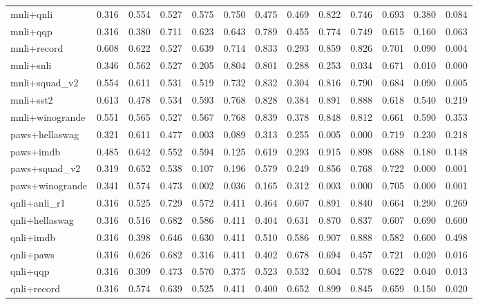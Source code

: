 \begin{table}[t]
\begin{tabular}{lrrrrrrrrrrrr}
    mnli+qnli & 0.316 & 0.554 & 0.527 & 0.575 & 0.750 & 0.475 & 0.469 & 0.822 & 0.746 & 0.693 & 0.380 & 0.084 \\
    mnli+qqp & 0.316 & 0.380 & 0.711 & 0.623 & 0.643 & 0.789 & 0.455 & 0.774 & 0.749 & 0.615 & 0.160 & 0.063 \\
    mnli+record & 0.608 & 0.622 & 0.527 & 0.639 & 0.714 & 0.833 & 0.293 & 0.859 & 0.826 & 0.701 & 0.090 & 0.004 \\
    mnli+snli & 0.346 & 0.562 & 0.527 & 0.205 & 0.804 & 0.801 & 0.288 & 0.253 & 0.034 & 0.671 & 0.010 & 0.000 \\
    mnli+squad\_v2 & 0.554 & 0.611 & 0.531 & 0.519 & 0.732 & 0.832 & 0.304 & 0.816 & 0.790 & 0.684 & 0.090 & 0.005 \\
    mnli+sst2 & 0.613 & 0.478 & 0.534 & 0.593 & 0.768 & 0.828 & 0.384 & 0.891 & 0.888 & 0.618 & 0.540 & 0.219 \\
    mnli+winogrande & 0.551 & 0.565 & 0.527 & 0.567 & 0.768 & 0.839 & 0.378 & 0.848 & 0.812 & 0.661 & 0.590 & 0.353 \\
    paws+hellaswag & 0.321 & 0.611 & 0.477 & 0.003 & 0.089 & 0.313 & 0.255 & 0.005 & 0.000 & 0.719 & 0.230 & 0.218 \\
    paws+imdb & 0.485 & 0.642 & 0.552 & 0.594 & 0.125 & 0.619 & 0.293 & 0.915 & 0.898 & 0.688 & 0.180 & 0.148 \\
    paws+squad\_v2 & 0.319 & 0.652 & 0.538 & 0.107 & 0.196 & 0.579 & 0.249 & 0.856 & 0.768 & 0.722 & 0.000 & 0.001 \\
    paws+winogrande & 0.341 & 0.574 & 0.473 & 0.002 & 0.036 & 0.165 & 0.312 & 0.003 & 0.000 & 0.705 & 0.000 & 0.001 \\
    qnli+anli\_r1 & 0.316 & 0.525 & 0.729 & 0.572 & 0.411 & 0.464 & 0.607 & 0.891 & 0.840 & 0.664 & 0.290 & 0.269 \\
    qnli+hellaswag & 0.316 & 0.516 & 0.682 & 0.586 & 0.411 & 0.404 & 0.631 & 0.870 & 0.837 & 0.607 & 0.690 & 0.600 \\
    qnli+imdb & 0.316 & 0.398 & 0.646 & 0.630 & 0.411 & 0.510 & 0.586 & 0.907 & 0.888 & 0.582 & 0.600 & 0.498 \\
    qnli+paws & 0.316 & 0.626 & 0.682 & 0.316 & 0.411 & 0.402 & 0.678 & 0.694 & 0.457 & 0.721 & 0.020 & 0.016 \\
    qnli+qqp & 0.316 & 0.309 & 0.473 & 0.570 & 0.375 & 0.523 & 0.532 & 0.604 & 0.578 & 0.622 & 0.040 & 0.013 \\
    qnli+record & 0.316 & 0.574 & 0.639 & 0.525 & 0.411 & 0.400 & 0.652 & 0.899 & 0.845 & 0.659 & 0.150 & 0.020 \\

\end{tabular}
\end{table}
